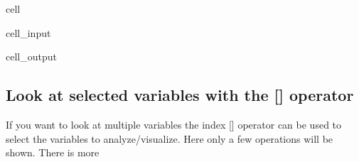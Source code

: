 \documentclass[letterpaper,10pt,english]{jupyterBook}
\begin{document}
\begin{sphinxuseclass}{cell}
\begin{sphinxVerbatimInput}
\begin{sphinxuseclass}{cell_input}
\end{sphinxuseclass}\end{sphinxVerbatimInput}
\begin{sphinxVerbatimOutput}

\begin{sphinxuseclass}{cell_output}
\noindent{}

\noindent{}

\end{sphinxuseclass}\end{sphinxVerbatimOutput}

\end{sphinxuseclass}

\subsection{Look at selected variables with the {[}{]} operator}
\label{\detokenize{content/howto/targetinstruments/One target one instrument with 3 instrument variables:look-at-selected-variables-with-the-operator}}
\sphinxAtStartPar
If you want to look at multiple variables the index {[}{]} operator can be used to select the variables to analyze/visualize. Here only a few operations will be shown. There is more {\hyperref[\detokenize{content/Python/modelflow_features:index-operator}]{}}
\end{document}
